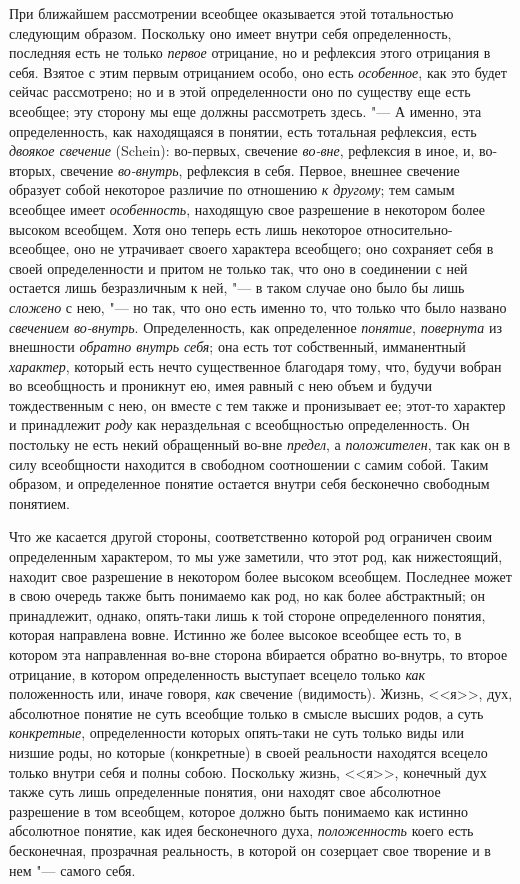 При ближайшем рассмотрении всеобщее оказывается этой
тотальностью следующим образом. Поскольку оно имеет внутри себя
определенность, последняя есть не только
{\em первое} отрицание,
но и рефлексия этого отрицания в себя. Взятое с этим первым отрицанием
особо, оно есть {\em особенное},
как это будет сейчас рассмотрено; но и в этой определенности
оно по существу еще есть всеобщее; эту сторону мы еще должны рассмотреть
здесь. "--- \label{bkm:bm23a}А именно, эта определенность, как
находящаяся в понятии, есть тотальная рефлексия, есть
{\em двоякое свечение} (Schein):
во-первых, свечение
{\em во-вне}, рефлексия в
иное, и, во-вторых, свечение
{\em во-внутрь},
рефлексия в себя. Первое, внешнее свечение образует собой
некоторое различие по отношению {\em к
другому}; тем самым всеобщее имеет
{\em особенность},
находящую свое разрешение в некотором более высоком всеобщем.
Хотя оно теперь есть лишь некоторое относительно-всеобщее, оно не
утрачивает своего характера всеобщего; оно сохраняет себя в своей
определенности и притом не только так, что оно в соединении с ней остается
лишь безразличным к ней, "--- в таком случае оно было бы лишь
{\em сложено} с нею, "---
но так, что оно есть именно то, что только что было названо
{\em свечением во-внутрь}.
Определенность, как определенное
{\em понятие},
{\em повернута} из
внешности {\em обратно внутрь себя};
она есть тот собственный, имманентный
{\em характер}, который
есть нечто существенное благодаря тому, что, будучи вобран во всеобщность и
проникнут ею, имея равный с нею объем и будучи тождественным с нею, он
вместе с тем также и пронизывает ее; этот-то характер и принадлежит
{\em роду} как
нераздельная с всеобщностью определенность. Он постольку не есть некий
обращенный во-вне {\em предел},
а {\em положителен},
так как он в силу всеобщности находится в свободном
соотношении с самим собой. Таким образом, и определенное понятие остается
внутри себя бесконечно свободным понятием.

Что же касается другой стороны, соответственно которой род
ограничен своим определенным характером, то мы уже заметили, что
этот род, как нижестоящий, находит свое разрешение в
некотором более высоком всеобщем. Последнее может в свою очередь также быть
понимаемо как род, но как более абстрактный; он принадлежит, однако,
опять-таки лишь к той стороне определенного понятия, которая направлена
вовне. Истинно же более высокое всеобщее есть то, в котором эта
направленная во-вне сторона вбирается обратно во-внутрь, то второе
отрицание, в котором определенность выступает всецело только
{\em как} положенность
или, иначе говоря, {\em как}
свечение (видимость). Жизнь, <<я>>, дух, абсолютное понятие не
суть всеобщие только в смысле высших родов, а суть
{\em конкретные},
определенности которых опять-таки не суть только виды или
низшие роды, но которые (конкретные) в своей реальности находятся всецело
только внутри себя и полны собою. Поскольку жизнь, <<я>>, конечный дух также
суть лишь определенные понятия, они находят свое абсолютное разрешение в
том всеобщем, которое должно быть понимаемо как истинно абсолютное понятие,
как идея бесконечного духа,
{\em положенность} коего
есть бесконечная, прозрачная реальность, в которой он созерцает свое
творение и в нем "--- самого себя.

